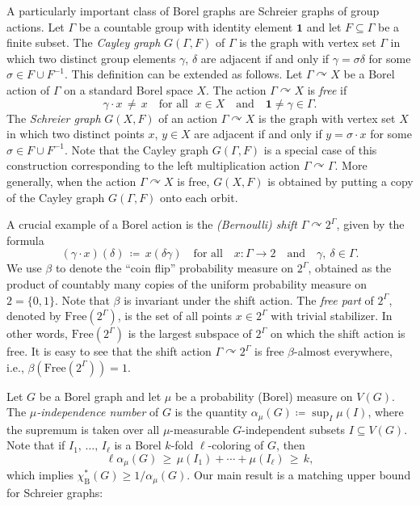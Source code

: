 \documentclass[AHL,Unicode,longabstracts,published]{cedram}
\newcommand{\0}{\varnothing}
\newcommand{\set}[1]{\{#1\}}
\renewcommand{\geq}{\geqslant}
\newcommand{\defeq}{\coloneqq}
\newcommand{\Free}{\mathrm{Free}}
\newcommand{\rmB}{\mathrm{B}}
\newcommand{\bfun}{\mathbf{1}}
\begin{document}
A particularly important class of Borel graphs are Schreier graphs of group actions. Let $\Gamma$ be a countable group with identity element $\bfun$ and let $F \subseteq \Gamma$ be a finite subset. The \emph{Cayley graph} $G(\Gamma, F)$ of $\Gamma$ is the graph with vertex set $\Gamma$ in which two distinct group elements $\gamma$, $\delta$ are adjacent if and only if $\gamma =\sigma \delta$ for some $\sigma \in F \cup F^{-1}$. This definition can be extended as follows. Let $\Gamma \curvearrowright X$ be a Borel action of $\Gamma$ on a standard Borel space $X$. The action $\Gamma \curvearrowright X$ is \emph{free} if
\[
\gamma \cdot x \,\neq\, x \quad \text{for all }\; x \in X\quad \text{and}\quad \bfun \neq \gamma \in \Gamma.
\]
The \emph{Schreier graph} $G(X,F)$ of an action $\Gamma \curvearrowright X$ is the graph with vertex set $X$ in which two distinct points $x$, $y \in X$ are adjacent if and only if $y = \sigma \cdot x$ for some $\sigma \in F \cup F^{-1}$. Note that the Cayley graph $G(\Gamma, F)$ is a special case of this construction corresponding to the left multiplication action $\Gamma \curvearrowright \Gamma$. More generally, when the action $\Gamma \curvearrowright X$ is free, $G(X, F)$ is obtained by putting a copy of the Cayley graph $G(\Gamma, F)$ onto each orbit.

A crucial example of a Borel action is the \emph{(Bernoulli) shift} $\Gamma \curvearrowright 2^\Gamma$, given by the formula
\[
(\gamma \cdot x)(\delta) \,
\defeq\, x(\delta \gamma) \quad \text{for all}\quad x \colon \Gamma \to 2 \quad\text{and}\quad \gamma,\ \delta \in \Gamma.
\]
We use $\beta$ to denote the ``coin flip'' probability measure on $2^\Gamma$, obtained as the product of countably many copies of the uniform probability measure on $2 = \set{0,1}$. Note that $\beta$ is invariant under the shift action. The \emph{free part} of $2^\Gamma$, denoted by $\Free(2^\Gamma)$, is the set of all points $x \in 2^\Gamma$ with trivial stabilizer. In other words, $\Free(2^\Gamma)$ is the largest subspace of $2^\Gamma$ on which the shift action is free. It is easy to see that the shift action $\Gamma \curvearrowright 2^\Gamma$ is free $\beta$-almost everywhere, i.e., $\beta(\Free(2^\Gamma)) = 1$.

Let $G$ be a Borel graph and let $\mu$ be a probability (Borel) measure on $V(G)$. The \emph{$\mu$-independence number} of $G$ is the quantity $\alpha_\mu(G)
\defeq \sup_I \mu(I)$, where the supremum is taken over all $\mu$-measurable $G$-independent subsets $I \subseteq V(G)$. Note that if $I_1,\, \ldots,\, I_\ell$ is a Borel $k$-fold $\ell$-coloring of $G$, then
\[
\ell \alpha_\mu(G) \,\geq\, \mu(I_1) + \cdots + \mu(I_\ell) \,\geq\, k,
\]
which implies $\chi^\ast_\rmB(G) \geq 1/\alpha_\mu(G)$. Our main result is a matching upper bound for Schreier graphs:
\end{document}
